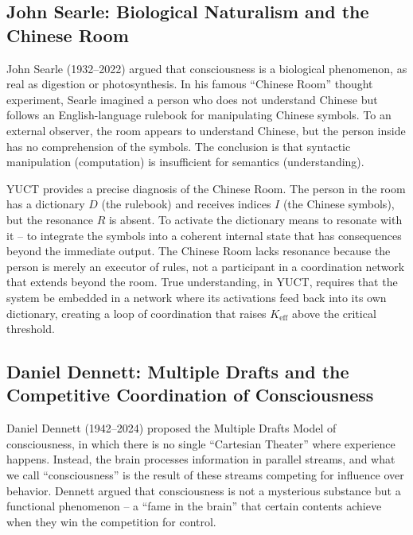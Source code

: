 \documentclass[12pt,a4paper]{article}
\begin{document}
	\subsection{John Searle: Biological Naturalism and the Chinese Room}
	
	John Searle (1932–2022) argued that consciousness is a biological phenomenon, as real as digestion or photosynthesis. In his famous ``Chinese Room'' thought experiment, Searle imagined a person who does not understand Chinese but follows an English-language rulebook for manipulating Chinese symbols. To an external observer, the room appears to understand Chinese, but the person inside has no comprehension of the symbols. The conclusion is that syntactic manipulation (computation) is insufficient for semantics (understanding).
	
	YUCT provides a precise diagnosis of the Chinese Room. The person in the room has a dictionary \(D\) (the rulebook) and receives indices \(I\) (the Chinese symbols), but the resonance \(R\) is absent. To activate the dictionary means to resonate with it -- to integrate the symbols into a coherent internal state that has consequences beyond the immediate output. The Chinese Room lacks resonance because the person is merely an executor of rules, not a participant in a coordination network that extends beyond the room. True understanding, in YUCT, requires that the system be embedded in a network where its activations feed back into its own dictionary, creating a loop of coordination that raises \(K_{\mathrm{eff}}\) above the critical threshold.
	
	\subsection{Daniel Dennett: Multiple Drafts and the Competitive Coordination of Consciousness}
	
	Daniel Dennett (1942–2024) proposed the Multiple Drafts Model of consciousness, in which there is no single ``Cartesian Theater'' where experience happens. Instead, the brain processes information in parallel streams, and what we call ``consciousness'' is the result of these streams competing for influence over behavior. Dennett argued that consciousness is not a mysterious substance but a functional phenomenon -- a ``fame in the brain'' that certain contents achieve when they win the competition for control.
	
\end{document}
